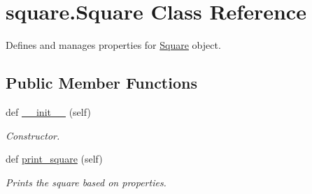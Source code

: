\hypertarget{classsquare_1_1_square}{}\section{square.\+Square Class Reference}
\label{classsquare_1_1_square}


Defines and manages properties for \mbox{\hyperlink{classsquare_1_1_square}{Square}} object.  


\subsection*{Public Member Functions}
\begin{DoxyCompactItemize}
\item 
\mbox{\label{classsquare_1_1_square_a32e445dc381a641dbc1d3136171952d1}} 
def \mbox{\hyperlink{classsquare_1_1_square_a32e445dc381a641dbc1d3136171952d1}{\+\_\+\+\_\+init\+\_\+\+\_\+}} (self)
\begin{DoxyCompactList}\small\item\em Constructor. \end{DoxyCompactList}\item 
\mbox{\label{classsquare_1_1_square_a5a407995e42599755a899984eedef3f1}} 
def \mbox{\hyperlink{classsquare_1_1_square_a5a407995e42599755a899984eedef3f1}{print\+\_\+square}} (self)
\begin{DoxyCompactList}\small\item\em Prints the square based on properties. \end{DoxyCompactList}\end{DoxyCompactItemize}
